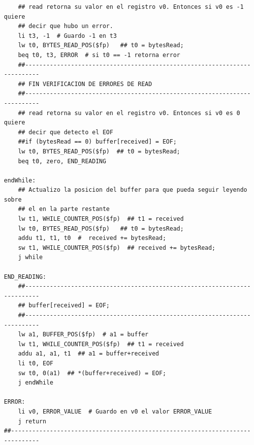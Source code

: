 \documentclass[a4paper,10pt]{article}
\begin{document}
\begin{lstlisting}
    ## read retorna su valor en el registro v0. Entonces si v0 es -1 quiere
    ## decir que hubo un error.
    li t3, -1  # Guardo -1 en t3
    lw t0, BYTES_READ_POS($fp)   ## t0 = bytesRead;
    beq t0, t3, ERROR  # si t0 == -1 retorna error
    ##--------------------------------------------------------------------------
    ## FIN VERIFICACION DE ERRORES DE READ
    ##--------------------------------------------------------------------------
    ## read retorna su valor en el registro v0. Entonces si v0 es 0 quiere
    ## decir que detecto el EOF
    ##if (bytesRead == 0) buffer[received] = EOF;
    lw t0, BYTES_READ_POS($fp)  ## t0 = bytesRead;
    beq t0, zero, END_READING

endWhile:
    ## Actualizo la posicion del buffer para que pueda seguir leyendo sobre
    ## el en la parte restante
    lw t1, WHILE_COUNTER_POS($fp)  ## t1 = received
    lw t0, BYTES_READ_POS($fp)   ## t0 = bytesRead;
    addu t1, t1, t0  #  received += bytesRead;
    sw t1, WHILE_COUNTER_POS($fp)  ## received += bytesRead;
    j while

END_READING:
    ##--------------------------------------------------------------------------
    ## buffer[received] = EOF;
    ##--------------------------------------------------------------------------
    lw a1, BUFFER_POS($fp)  # a1 = buffer
    lw t1, WHILE_COUNTER_POS($fp)  ## t1 = received
    addu a1, a1, t1  ## a1 = buffer+received
    li t0, EOF
    sw t0, 0(a1)  ## *(buffer+received) = EOF;
    j endWhile

ERROR:
    li v0, ERROR_VALUE  # Guardo en v0 el valor ERROR_VALUE
    j return
##------------------------------------------------------------------------------
            \end{lstlisting}
            
\end{document}
